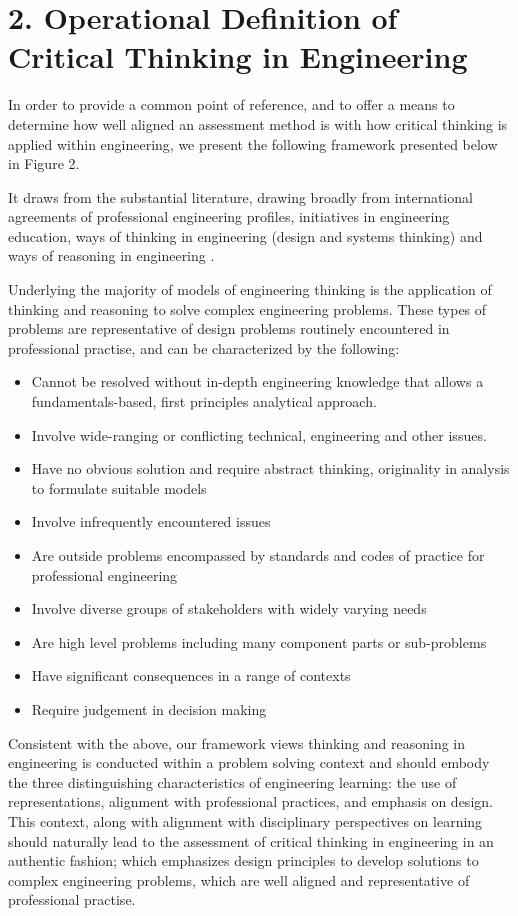 \section{2. Operational Definition of Critical Thinking in Engineering}

In order to provide a common point of reference, and to offer a means to determine how well aligned an assessment method is with how critical thinking is applied within engineering, we present the following framework presented below in Figure 2.

It draws from the substantial literature, drawing broadly from international agreements of professional engineering profiles\cite{internationalengineeringalliance}, initiatives in engineering education\cite{crawley2011cdio}, ways of thinking in engineering (design and systems thinking) \cite{Dorst:2010tc, Dym:2005gy, Frank:2001ut}and ways of reasoning in engineering \cite{Stein:2011hr, Paul:2006kv}. 

Underlying the majority of models of engineering thinking is the application of thinking and reasoning to solve complex engineering problems. These types of problems are representative of design problems routinely encountered in professional practise, and can be characterized by the following: 

\begin{itemize}
\item Cannot be resolved without in-depth engineering knowledge that allows a fundamentals-based, first principles analytical approach.
\item Involve wide-ranging or conflicting technical, engineering and other issues.
\item Have no obvious solution and require abstract thinking, originality in analysis to formulate suitable models
\item Involve infrequently encountered issues
\item Are outside problems encompassed by standards and codes of practice for professional engineering
\item Involve diverse groups of stakeholders with widely varying needs
\item Are high level problems including many component parts or sub-problems
\item Have significant consequences in a range of contexts
\item Require judgement in decision making
\end{itemize}

Consistent with the above, our framework views thinking and reasoning in engineering is conducted within a problem solving context and should embody the three distinguishing characteristics of engineering learning: the use of representations, alignment with professional practices, and emphasis on design\cite{Johri:2014tk}. This context, along with alignment with disciplinary perspectives on learning should naturally lead to the assessment of critical thinking in engineering in an authentic fashion; which emphasizes design principles to develop solutions to  complex engineering problems, which are well aligned and representative of professional practise.

